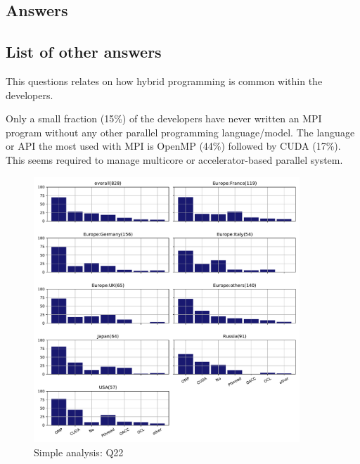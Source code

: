 
\subsection{Answers}



\subsection{List of other answers}
\begin{itemize}

\end{itemize}
This questions relates on how hybrid programming is common within the
developers. 

Only a small fraction (15\%) of the developers have never written an MPI  program
without any other parallel programming language/model. The language
or API the most used with MPI is OpenMP (44\%) followed by CUDA
(17\%). This seems required to manage multicore or accelerator-based parallel
system. 

\begin{figure}[htb]
\begin{center}
\includegraphics[width=10cm]{../pdfs/Q22.pdf}
\caption{Simple analysis: Q22}
\label{fig:Q22}
\end{center}
\end{figure}

